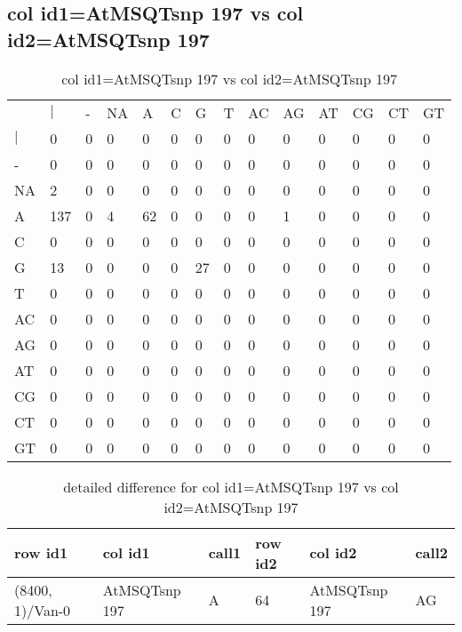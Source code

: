 \subsection{col id1=AtMSQTsnp 197 vs col id2=AtMSQTsnp 197}
\begin{center}
\begin{longtable}{|l|l|l|l|l|l|l|l|l|l|l|l|l|l|}
\caption{col id1=AtMSQTsnp 197 vs col id2=AtMSQTsnp 197} \label{table_dm574}\\
\hline
\\
\hline
&$|$&-&NA&A&C&G&T&AC&AG&AT&CG&CT&GT\\
$|$&0&0&0&0&0&0&0&0&0&0&0&0&0\\
-&0&0&0&0&0&0&0&0&0&0&0&0&0\\
NA&2&0&0&0&0&0&0&0&0&0&0&0&0\\
A&137&0&4&62&0&0&0&0&1&0&0&0&0\\
C&0&0&0&0&0&0&0&0&0&0&0&0&0\\
G&13&0&0&0&0&27&0&0&0&0&0&0&0\\
T&0&0&0&0&0&0&0&0&0&0&0&0&0\\
AC&0&0&0&0&0&0&0&0&0&0&0&0&0\\
AG&0&0&0&0&0&0&0&0&0&0&0&0&0\\
AT&0&0&0&0&0&0&0&0&0&0&0&0&0\\
CG&0&0&0&0&0&0&0&0&0&0&0&0&0\\
CT&0&0&0&0&0&0&0&0&0&0&0&0&0\\
GT&0&0&0&0&0&0&0&0&0&0&0&0&0\\
\hline
\end{longtable}
\end{center}

\begin{center}
\begin{longtable}{|l|l|l|l|l|l|}
\caption{detailed difference for col id1=AtMSQTsnp 197 vs col id2=AtMSQTsnp 197} \label{table_dm575}\\
\hline
row id1&col id1&call1&row id2&col id2&call2\\
\hline
(8400, 1)/Van-0&AtMSQTsnp 197&A&64&AtMSQTsnp 197&AG\\
\hline
\end{longtable}
\end{center}

